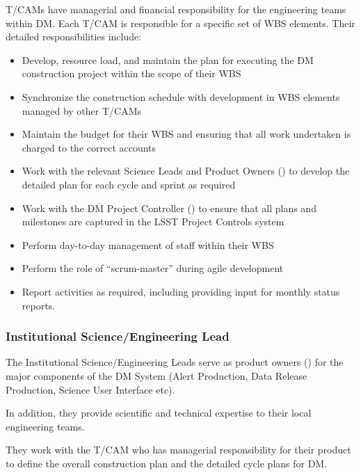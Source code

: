 \glspl{T/CAM} have managerial and financial responsibility for the engineering teams within \gls{DM}.
Each \gls{T/CAM} is responsible for a specific set of \gls{WBS} elements.
Their detailed responsibilities include:

\begin{itemize}

  \item{Develop, resource load, and maintain the plan for executing the \gls{DM} construction project within the scope of their WBS}
  \item{Synchronize the construction schedule with development in \gls{WBS} elements managed by other T/CAMs}
  \item{Maintain the budget for their \gls{WBS} and ensuring that all work undertaken is charged to the correct accounts}
  \item{Work with the relevant Science Leads and Product Owners () to develop the detailed plan for each cycle and sprint as required}
  \item{Work with the \gls{DM} Project Controller () to ensure that all plans and milestones are captured in the \gls{LSST} Project Controls system}
  \item{Perform day-to-day management of staff within their \gls{WBS}}
  \item{Perform the role of ``scrum-master'' during agile development}
  \item{Report activities as required, including providing input for monthly status reports.}

\end{itemize}

\subsubsection{Institutional Science/Engineering Lead \label{role:scilead}}

The Institutional Science/Engineering Leads serve as product owners () for the major components of the \gls{DM} System (\gls{Alert Production}, Data \gls{Release} Production, Science User Interface etc).

In addition, they provide scientific and technical expertise to their local engineering teams.

They work with the \gls{T/CAM} who has managerial responsibility for their product to define the overall construction plan and the detailed cycle plans for \gls{DM}.

